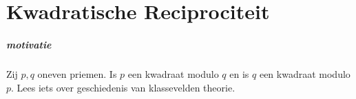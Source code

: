 \chapter{Kwadratische Reciprociteit} \label{chap:kwadratische_reciprociteit}

\paragraph{motivatie}
Zij $p, q $ oneven priemen. Is $p$ een  kwadraat modulo  $q$ en is $q$ een kwadraat modulo $p$. 
Lees iets over geschiedenis van klassevelden theorie.
